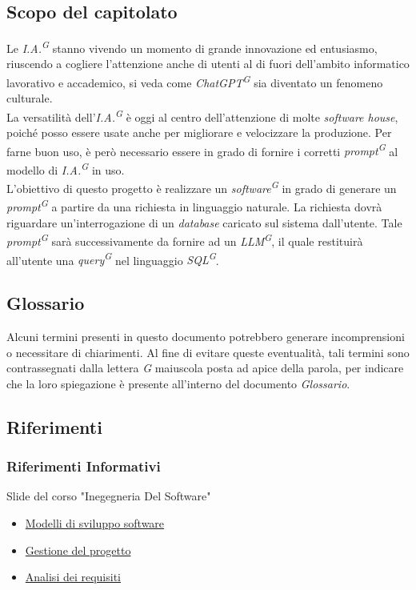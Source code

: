 \documentclass[5pt]{article}
\begin{document}
\subsection{Scopo del capitolato}
Le \textit{I.A.\textsuperscript{G}} stanno vivendo un momento di grande innovazione ed entusiasmo, 
riuscendo a cogliere l'attenzione anche di utenti al di fuori dell'ambito informatico lavorativo e accademico, 
si veda come \textit{ChatGPT\textsuperscript{G}} sia diventato un fenomeno culturale. \\
La versatilità dell'\textit{I.A.\textsuperscript{G}} è oggi al centro dell'attenzione di molte \textit{software house}, 
poiché posso essere usate anche per migliorare e velocizzare la produzione. 
Per farne buon uso, è però necessario essere in grado di fornire i corretti \textit{prompt\textsuperscript{G}} al 
modello di \textit{I.A.\textsuperscript{G}} in uso. \\


L'obiettivo di questo progetto è realizzare un \textit{software\textsuperscript{G}} in grado di generare 
un \textit{prompt\textsuperscript{G}} a partire da una richiesta in linguaggio naturale. La richiesta dovrà riguardare un'interrogazione 
di un \textit{database} caricato sul sistema dall'utente. Tale \textit{prompt\textsuperscript{G}} sarà successivamente da fornire 
ad un \textit{LLM\textsuperscript{G}}, il quale restituirà all'utente una \textit{query\textsuperscript{G}} nel linguaggio 
\textit{SQL\textsuperscript{G}}.

\subsection{Glossario}
Alcuni termini presenti in questo documento potrebbero generare incomprensioni o necessitare di chiarimenti. 
Al fine di evitare queste eventualità, tali termini sono contrassegnati dalla lettera \textit{G} maiuscola posta ad apice della parola, 
per indicare che la loro spiegazione è presente all'interno del documento \textit{Glossario}.

\subsection{Riferimenti}
\subsubsection{Riferimenti Informativi}
Slide del corso "Inegegneria Del Software"
\begin{itemize}
      \item \href{https://www.math.unipd.it/~tullio/IS-1/2023/Dispense/T3.pdf}{Modelli di sviluppo software}
      \item \href{https://www.math.unipd.it/~tullio/IS-1/2023/Dispense/T4.pdf}{Gestione del progetto}
      \item \href{https://www.math.unipd.it/~tullio/IS-1/2023/Dispense/T5.pdf}{Analisi dei requisiti} 
\end{itemize}
\end{document}

